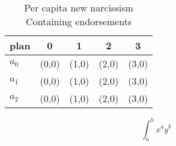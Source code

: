 \documentclass[a4paper]{article}
\begin{document}
\begin{table}
\begin{adjustbox}{width=0.5\columnwidth}
\begin{tabular}{|l|l|l|l|l|}
\hline
\textbf{plan} & \multicolumn{1}{c|}{\textbf{0}} & \multicolumn{1}{c|}{\textbf{1}} & \multicolumn{1}{c|}{\textbf{2}} & \multicolumn{1}{c|}{\textbf{3}} \\ \hline
\textbf{$a_0$}  & (0,0) & (1,0) & (2,0) & (3,0) \\ \hline
\textbf{$a_1$}  & (0,0) & (1,0) & (2,0) & (3,0) \\ \hline
\textbf{$a_2$}  & (0,0) & (1,0) & (2,0) & (3,0) \\ \hline
\end{tabular}
\end{adjustbox}
\caption{Per capita new narcissism Containing endorsements
}
\end{table}

\[ \int_{a}^{b}{x^{a}y^{b}} \]
\end{document}
